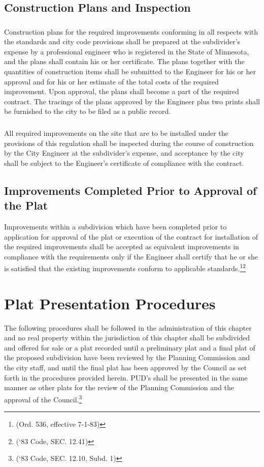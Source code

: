 \subsection{Construction Plans and Inspection}
\subsubsection{}
Construction plans for the required improvements conforming in all respects with the standards and city code provisions shall be prepared at the subdivider’s expense by a professional engineer who is registered in the State of Minnesota, and the plans shall contain his or her certificate. The plans together with the quantities of construction items shall be submitted to the Engineer for his or her approval and for his or her estimate of the total costs of the required improvement. Upon approval, the plans shall become a part of the required contract. The tracings of the plans approved by the Engineer plus two prints shall be furnished to the city to be filed as a public record.
\subsubsection{}
All required improvements on the site that are to be installed under the provisions of this regulation shall be inspected during the course of construction by the City Engineer at the subdivider’s expense, and acceptance by the city shall be subject to the Engineer’s certificate of compliance with the contract.
\subsection{Improvements Completed Prior to Approval of the Plat}
Improvements within a subdivision which have been completed prior to application for approval of the plat or execution of the contract for installation of the required improvements shall be accepted as equivalent improvements in compliance with the requirements only if the Engineer shall certify that he or she is satisfied that the existing improvements conform to applicable standards.\footnote{(Ord. 536, effective 7-1-83)}\footnote{(‘83 Code, SEC. 12.41)}


\setcounter{section}{64}
\section{Plat Presentation Procedures}
The following procedures shall be followed in the administration of this chapter and no real property within the jurisdiction of this chapter shall be subdivided and offered for sale or a plat recorded until a preliminary plat and a final plat of the proposed subdivision have been reviewed by the Planning Commission and the city staff, and until the final plat has been approved by the Council as set forth in the procedures provided herein. PUD’s shall be presented in the same manner as other plats for the review of the Planning Commission and the approval of the Council.\footnote{(‘83 Code, SEC. 12.10, Subd. 1)}
